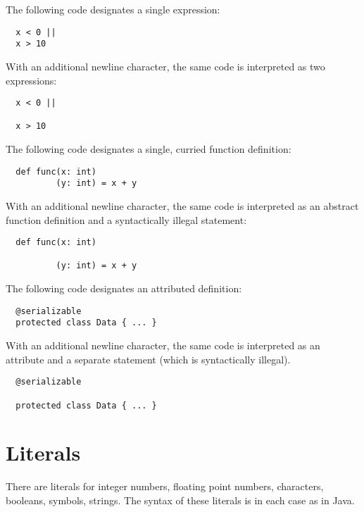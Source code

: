 \example The following code designates a single expression:

\begin{lstlisting}
  x < 0 ||
  x > 10
\end{lstlisting}

With an additional newline character, the same code is interpreted as
two expressions:

\begin{lstlisting}
  x < 0 ||

  x > 10
\end{lstlisting}

\example The following code designates a single, curried function definition:

\begin{lstlisting}
  def func(x: int)
          (y: int) = x + y
\end{lstlisting}

With an additional newline character, the same code is interpreted as
an abstract function definition and a syntactically illegal statement:

\begin{lstlisting}
  def func(x: int)

          (y: int) = x + y
\end{lstlisting}

\example The following code designates an attributed definition:

\begin{lstlisting}
  @serializable
  protected class Data { ... }
\end{lstlisting}

With an additional newline character, the same code is interpreted as
an attribute and a separate statement (which is syntactically
illegal).

\begin{lstlisting}
  @serializable

  protected class Data { ... }
\end{lstlisting}


\section{Literals}\label{sec:literals}

There are literals for integer numbers, floating point numbers,
characters, booleans, symbols, strings.  The syntax of these literals is in
each case as in Java.


